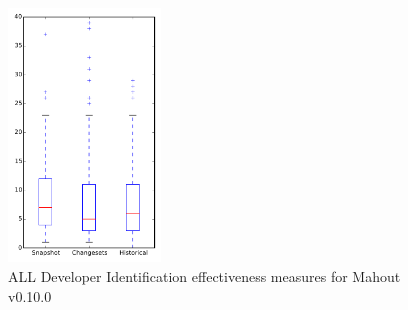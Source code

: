 
\begin{figure}[t]
\centering
\includegraphics[width=0.36\textwidth]{figures/dit/all_mahout}
\caption{ALL Developer Identification effectiveness measures for Mahout v0.10.0}
\label{fig:dit:all:mahout}
\end{figure}
